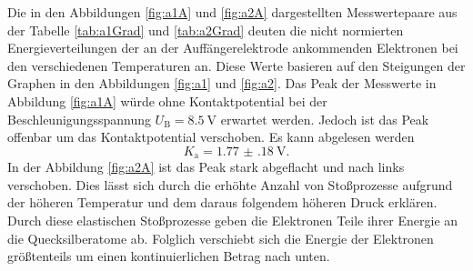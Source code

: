 Die in den Abbildungen \ref{fig:a1A} und \ref{fig:a2A} dargestellten Messwertepaare aus der Tabelle \ref{tab:a1Grad} und \ref{tab:a2Grad} deuten die nicht normierten Energieverteilungen der an der Auffängerelektrode ankommenden Elektronen bei den verschiedenen Temperaturen an. Diese Werte basieren auf den Steigungen der Graphen in den Abbildungen \ref{fig:a1} und \ref{fig:a2}.
Das Peak der Messwerte in Abbildung \ref{fig:a1A} würde ohne Kontaktpotential bei der Beschleunigungsspannung $U_\text{B}=\SI{8.5}{\volt}$ erwartet werden. Jedoch ist das Peak offenbar um das Kontaktpotential verschoben.
Es kann abgelesen werden
\begin{displaymath}
K_\text{a}=\SI{1.77(18)}{\volt}\text{.}
\end{displaymath}
In der Abbildung \ref{fig:a2A} ist das Peak stark abgeflacht und nach links verschoben. Dies lässt sich durch die erhöhte Anzahl von Stoßprozesse aufgrund der höheren Temperatur und dem daraus folgendem höheren Druck erklären. Durch diese elastischen Stoßprozesse geben die Elektronen Teile ihrer Energie an die Quecksilberatome ab. Folglich verschiebt sich die Energie der Elektronen größtenteils um einen kontinuierlichen Betrag nach unten.


